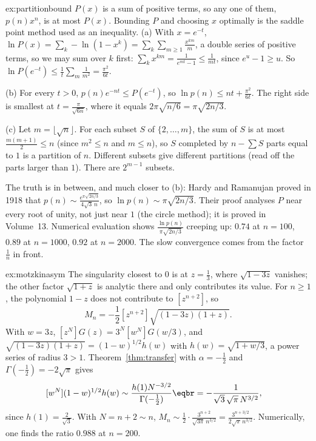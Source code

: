 \begin{solution}{ex:partitionbound}
\idea $P(x)$ is a sum of positive terms, so any one of them, $p(n)x^n$, is at most $P(x)$. Bounding $P$ and choosing $x$ optimally is the saddle point
method used as an inequality.
\writeup (a) With $x=e^{-t}$, $\ln P(x)=\sum_k-\ln(1-x^k)=\sum_k\sum_{m\ge1}\frac{x^{km}}m$, a double series of positive terms, so we may sum over $k$ first:
$\sum_kx^{km}=\frac1{e^{mt}-1}\le\frac1{mt}$, since $e^u-1\ge u$. So $\ln P(e^{-t})\le\frac1t\sum_m\frac1{m^2}=\frac{\pi^2}{6t}$.

(b) For every $t>0$, $p(n)e^{-nt}\le P(e^{-t})$, so $\ln p(n)\le nt+\frac{\pi^2}{6t}$. The right side is smallest at $t=\frac\pi{\sqrt{6n}}$, where it equals
$2\pi\sqrt{n/6}=\pi\sqrt{2n/3}$.

(c) Let $m=\lfloor\sqrt n\rfloor$. For each subset $S$ of $\{2,\dots,m\}$, the sum of $S$ is at most $\frac{m(m+1)}2\le n$ (since $m^2\le n$ and $m\le n$), so $S$ completed by
$n-\sum S$ parts equal to $1$ is a partition of $n$. Different subsets give different partitions (read off the parts larger than $1$). There are $2^{m-1}$ subsets.

The truth is in between, and much closer to (b): Hardy and Ramanujan proved in 1918 that $p(n)\sim\frac{e^{\pi\sqrt{2n/3}}}{4\sqrt3\,n}$, so $\ln p(n)\sim\pi\sqrt{2n/3}$. Their proof
analyses $P$ near every root of unity, not just near $1$ (the circle method); it is proved in Volume~13. Numerical evaluation shows $\frac{\ln p(n)}{\pi\sqrt{2n/3}}$ creeping
up: $0.74$ at $n=100$, $0.89$ at $n=1000$, $0.92$ at $n=2000$. The slow convergence comes from the factor $\frac1n$ in front.
\end{solution}

\begin{solution}{ex:motzkinasym}
\idea The singularity closest to $0$ is at $z=\frac13$, where $\sqrt{1-3z}$ vanishes; the other factor $\sqrt{1+z}$ is analytic there and only contributes its value.
\writeup For $n\ge1$, the polynomial $1-z$ does not contribute to $[z^{n+2}]$, so
\[
M_n=-\frac12[z^{n+2}]\sqrt{(1-3z)(1+z)}.
\]
With $w=3z$, $[z^N]G(z)=3^N[w^N]G(w/3)$, and $\sqrt{(1-3z)(1+z)}=(1-w)^{1/2}h(w)$ with $h(w)=\sqrt{1+w/3}$, a power series of radius $3>1$. Theorem~\ref{thm:transfer}
with $\alpha=-\frac12$ and $\Gamma(-\frac12)=-2\sqrt\pi$ gives
\[
\begin{aligned}{}[w^N](1-w)^{1/2}h(w)&\sim\frac{h(1)N^{-3/2}}{\Gamma(-\frac12)}\eqbr=-\frac{1}{\sqrt3\,\sqrt\pi\,N^{3/2}},\end{aligned}
\]
since $h(1)=\frac2{\sqrt3}$. With $N=n+2\sim n$, $M_n\sim\frac12\cdot\frac{3^{n+2}}{\sqrt{3\pi}\,n^{3/2}}=\frac{3^{n+3/2}}{2\sqrt\pi\,n^{3/2}}$. Numerically, one finds the ratio $0.988$ at $n=200$.
\end{solution}

